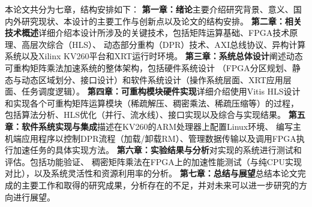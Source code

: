 本论文共分为七章，结构安排如下：
\textbf{第一章：绪论}主要介绍研究背景、意义、国内外研究现状、本设计的主要工作与创新点以及论文的结构安排。
\textbf{第二章：相关技术概述}详细介绍本设计所涉及的关键技术，包括矩阵运算基础、FPGA技术原理、高层次综合（HLS）、
动态部分重构（DPR）技术、AXI总线协议、异构计算系统以及Xilinx KV260平台和XRT运行时环境。
\textbf{第三章：系统总体设计}阐述动态可重构矩阵乘法加速系统的整体架构，包括硬件系统设计
（FPGA分区规划、静态与动态区域划分、接口设计）和软件系统设计（操作系统层面、XRT应用层面、任务调度逻辑）。
\textbf{第四章：可重构模块硬件实现}详细介绍使用Vitis HLS设计和实现各个可重构矩阵运算模块（稀疏解压、稠密乘法、稀疏压缩等）的过程，
包括算法分析、HLS优化（并行、流水线）、接口实现以及综合与实现结果。
\textbf{第五章：软件系统实现与集成}描述在KV260的ARM处理器上配置Linux环境、
编写主机端应用程序以控制DPR流程（加载/卸载RM）、管理数据传输以及调用FPGA执行加速任务的具体实现方法。
\textbf{第六章：实验结果与分析}对实现的系统进行测试和评估。包括功能验证、
稠密矩阵乘法在FPGA上的加速性能测试（与纯CPU实现对比），以及系统灵活性和资源利用率的分析。
\textbf{第七章：总结与展望}总结本论文完成的主要工作和取得的研究成果，分析存在的不足，并对未来可以进一步研究的方向进行展望。
